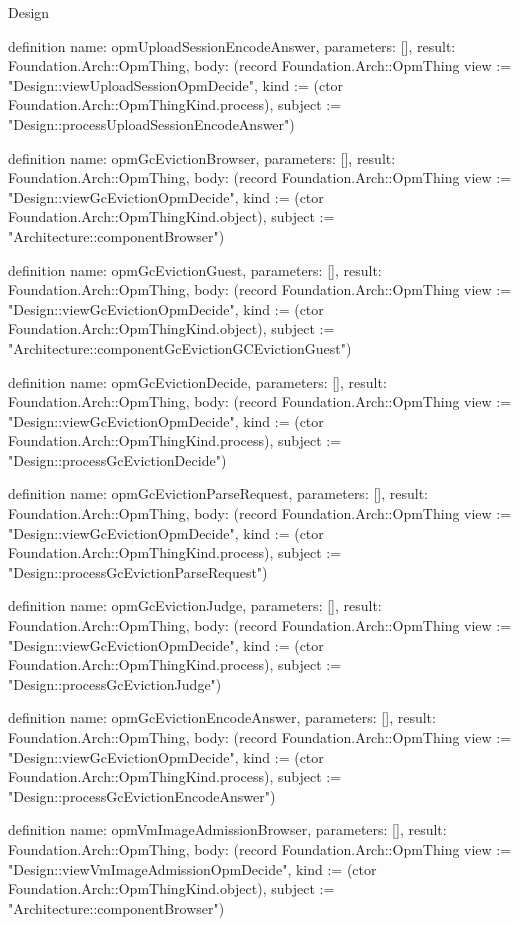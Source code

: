 \begin{lexlean}{Design}
\begin{semanticmodule}
definition{
  name: opmUploadSessionEncodeAnswer,
  parameters: [],
  result: Foundation.Arch::OpmThing,
  body: (record Foundation.Arch::OpmThing {view := "Design::viewUploadSessionOpmDecide", kind := (ctor Foundation.Arch::OpmThingKind.process), subject := "Design::processUploadSessionEncodeAnswer"})
}

definition{
  name: opmGcEvictionBrowser,
  parameters: [],
  result: Foundation.Arch::OpmThing,
  body: (record Foundation.Arch::OpmThing {view := "Design::viewGcEvictionOpmDecide", kind := (ctor Foundation.Arch::OpmThingKind.object), subject := "Architecture::componentBrowser"})
}

definition{
  name: opmGcEvictionGuest,
  parameters: [],
  result: Foundation.Arch::OpmThing,
  body: (record Foundation.Arch::OpmThing {view := "Design::viewGcEvictionOpmDecide", kind := (ctor Foundation.Arch::OpmThingKind.object), subject := "Architecture::componentGcEvictionGCEvictionGuest"})
}

definition{
  name: opmGcEvictionDecide,
  parameters: [],
  result: Foundation.Arch::OpmThing,
  body: (record Foundation.Arch::OpmThing {view := "Design::viewGcEvictionOpmDecide", kind := (ctor Foundation.Arch::OpmThingKind.process), subject := "Design::processGcEvictionDecide"})
}

definition{
  name: opmGcEvictionParseRequest,
  parameters: [],
  result: Foundation.Arch::OpmThing,
  body: (record Foundation.Arch::OpmThing {view := "Design::viewGcEvictionOpmDecide", kind := (ctor Foundation.Arch::OpmThingKind.process), subject := "Design::processGcEvictionParseRequest"})
}

definition{
  name: opmGcEvictionJudge,
  parameters: [],
  result: Foundation.Arch::OpmThing,
  body: (record Foundation.Arch::OpmThing {view := "Design::viewGcEvictionOpmDecide", kind := (ctor Foundation.Arch::OpmThingKind.process), subject := "Design::processGcEvictionJudge"})
}

definition{
  name: opmGcEvictionEncodeAnswer,
  parameters: [],
  result: Foundation.Arch::OpmThing,
  body: (record Foundation.Arch::OpmThing {view := "Design::viewGcEvictionOpmDecide", kind := (ctor Foundation.Arch::OpmThingKind.process), subject := "Design::processGcEvictionEncodeAnswer"})
}

definition{
  name: opmVmImageAdmissionBrowser,
  parameters: [],
  result: Foundation.Arch::OpmThing,
  body: (record Foundation.Arch::OpmThing {view := "Design::viewVmImageAdmissionOpmDecide", kind := (ctor Foundation.Arch::OpmThingKind.object), subject := "Architecture::componentBrowser"})
}


\end{semanticmodule}
\end{lexlean}
